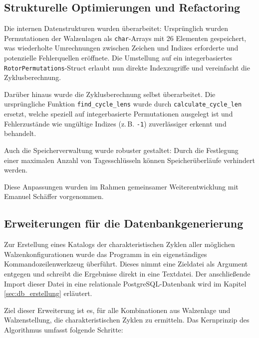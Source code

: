 \documentclass[12pt, ngerman, a4paper, numbers=noenddot]{article}
\begin{document}
\subsection{Strukturelle Optimierungen und Refactoring}
\label{subsec:c_structural}

Die internen Datenstrukturen wurden überarbeitet: Ursprünglich wurden Permutationen der Walzenlagen als \lstinline|char|-Arrays mit 26 Elementen gespeichert, was wiederholte Umrechnungen zwischen Zeichen und Indizes erforderte und potenzielle Fehlerquellen eröffnete. Die Umstellung auf ein integerbasiertes \lstinline|RotorPermutations|-Struct erlaubt nun direkte Indexzugriffe und vereinfacht die Zyklusberechnung.

Darüber hinaus wurde die Zyklusberechnung selbst überarbeitet. Die ursprüngliche Funktion \lstinline|find_cycle_lens| wurde durch \lstinline|calculate_cycle_len| ersetzt, welche speziell auf integerbasierte Permutationen ausgelegt ist und Fehlerzustände wie ungültige Indizes (z.\,B. \lstinline|-1|) zuverlässiger erkennt und behandelt. 

Auch die Speicherverwaltung wurde robuster gestaltet: Durch die Festlegung einer maximalen Anzahl von Tagesschlüsseln können Speicherüberläufe verhindert werden. 

Diese Anpassungen wurden im Rahmen gemeinsamer Weiterentwicklung mit Emanuel Schäffer vorgenommen. 


\newpage
\subsection{Erweiterungen für die Datenbankgenerierung}
\label{subsec:c_db_export}

Zur Erstellung eines Katalogs der charakteristischen Zyklen aller möglichen Walzenkonfigurationen wurde das Programm in ein eigenständiges Kommandozeilenwerkzeug überführt. Dieses nimmt eine Zieldatei als Argument entgegen und schreibt die Ergebnisse direkt in eine Textdatei. Der anschließende Import dieser Datei in eine relationale PostgreSQL-Datenbank wird im Kapitel \ref{sec:db_erstellung} erläutert.


Ziel dieser Erweiterung ist es, für alle Kombinationen aus Walzenlage und Walzenstellung, die charakteristischen Zyklen zu ermitteln. Das Kernprinzip des Algorithmus umfasst folgende Schritte:
\end{document}
